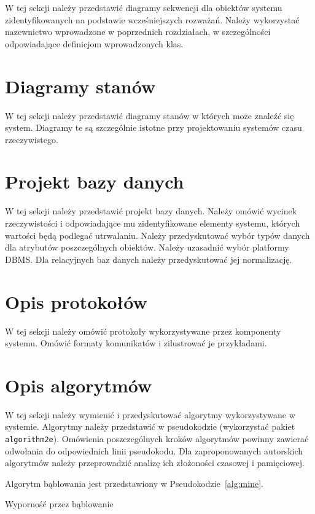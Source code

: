 W tej sekcji należy przedstawić diagramy sekwencji dla obiektów systemu zidentyfikowanych na podstawie wcześniejszych rozważań. Należy wykorzystać nazewnictwo wprowadzone w poprzednich rozdziałach, w szczególności odpowiadające definicjom wprowadzonych klas.

\section{Diagramy stanów}

W tej sekcji należy przedstawić diagramy stanów w których może znaleźć się system. Diagramy te są szczególnie istotne przy projektowaniu systemów czasu rzeczywistego. 

\section{Projekt bazy danych}

W tej sekcji należy przedstawić projekt bazy danych. Należy omówić wycinek rzeczywistości i odpowiadające mu zidentyfikowane elementy systemu, których wartości będą podlegać utrwalaniu. Należy przedyskutować wybór typów danych dla atrybutów poszczególnych obiektów. Należy uzasadnić wybór platformy DBMS. Dla relacyjnych baz danych należy przedyskutować jej normalizację.

\section{Opis protokołów}

W tej sekcji należy omówić protokoły wykorzystywane przez komponenty systemu. Omówić formaty komunikatów i zilustrować je przykładami. 

\section{Opis algorytmów}

W tej sekcji należy wymienić i przedyskutować algorytmy wykorzystywane w systemie. Algorytmy należy przedstawić w pseudokodzie (wykorzystać pakiet \texttt{algorithm2e}). Omówienia poszczególnych kroków algorytmów powinny zawierać odwołania do odpowiednich linii pseudokodu. Dla zaproponowanych autorskich algorytmów należy przeprowadzić analizę ich złożoności czasowej i pamięciowej. 

{\color{dgray}
Algorytm bąblowania jest przedstawiony w Pseudokodzie~\ref{alg:mine}.
}

{\small
\begin{pseudokod}[H]
\caption{Wyporność przez bąblowanie}\label{alg:mine}
\end{pseudokod}
}


